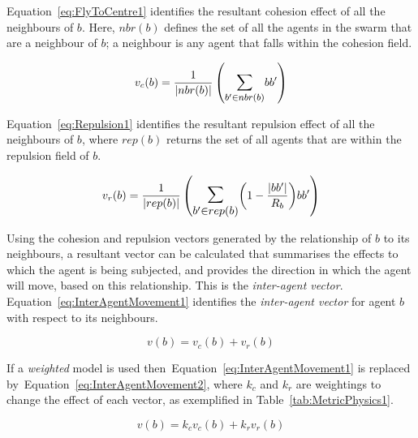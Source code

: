 \documentclass{ieeeaccess}
\begin{document}

Equation~\ref{eq:FlyToCentre1} identifies the resultant cohesion effect of all
the neighbours of $b$. Here, $nbr(b)$ defines the set of all the agents in the
swarm that are a neighbour of $b$; a neighbour is any agent that falls within
the cohesion field.

\begin{equation}\label{eq:FlyToCentre1}
v_{c}(b) = \frac{1}{|nbr(b)|}\left({\mathlarger{\sum_{b' \in nbr(b)}}{bb'}}\right)
\end{equation}

Equation~\ref{eq:Repulsion1} identifies the resultant repulsion effect of all
the neighbours of $b$, where $rep(b)$ returns the set of all agents that are
within the repulsion field of $b$.

\begin{equation}
\label{eq:Repulsion1}
v_{r}(b) = 
\frac{1}{|rep(b)|}
\left(
\mathlarger{\mathlarger{\sum_{b' \in rep(b)}}}
{\left( 1-\frac{|bb'|}{R_b} \right)}
{bb'}
\right)
\end{equation}

Using the cohesion and repulsion vectors generated by the relationship of $b$
to its neighbours, a resultant vector can be calculated that summarises the
effects to which the agent is being subjected, and provides the direction in
which the agent will move, based on this relationship. This is the
\textit{inter-agent vector}.  Equation~\ref{eq:InterAgentMovement1} identifies
the \textit{inter-agent vector} for agent $b$ with respect to its neighbours.

\begin{equation}\label{eq:InterAgentMovement1}
v(b) = v_{c}(b) + v_{r}(b)
\end{equation}

If a \textit{weighted} model is used then~Equation~\ref{eq:InterAgentMovement1}
is replaced by~Equation~\ref{eq:InterAgentMovement2}, where $k_c$ and $k_r$ are
weightings to change the effect of each vector, as exemplified in
Table~\ref{tab:MetricPhysics1}.

\begin{equation}\label{eq:InterAgentMovement2}
v(b) = k_cv_{c}(b) + k_rv_{r}(b)
\end{equation}
\end{document}
